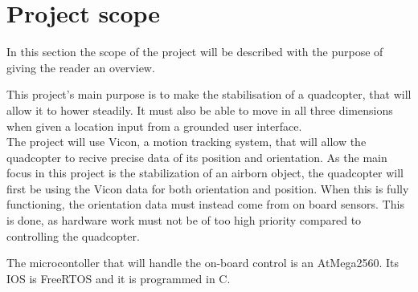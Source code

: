 \section{Project scope}

In this section the scope of the project will be described with the purpose of giving the reader an overview. \newpar

This project's main purpose is to make the stabilisation of a quadcopter, that will allow it to hower steadily. It must also be able to move in all three dimensions when given a location input from a grounded user interface. \\
The project will use Vicon, a motion tracking system, that will allow the quadcopter to recive precise data of its position and orientation. 
As the main focus in this project is the stabilization of an airborn object, the quadcopter will first be using the Vicon data for both orientation and position. When this is fully functioning, the orientation data must instead come from on board sensors. This is done, as hardware work must not be of too high priority compared to controlling the quadcopter. \newpar

The microcontoller that will handle the on-board control is an AtMega2560. Its IOS is FreeRTOS and it is programmed in C. 
